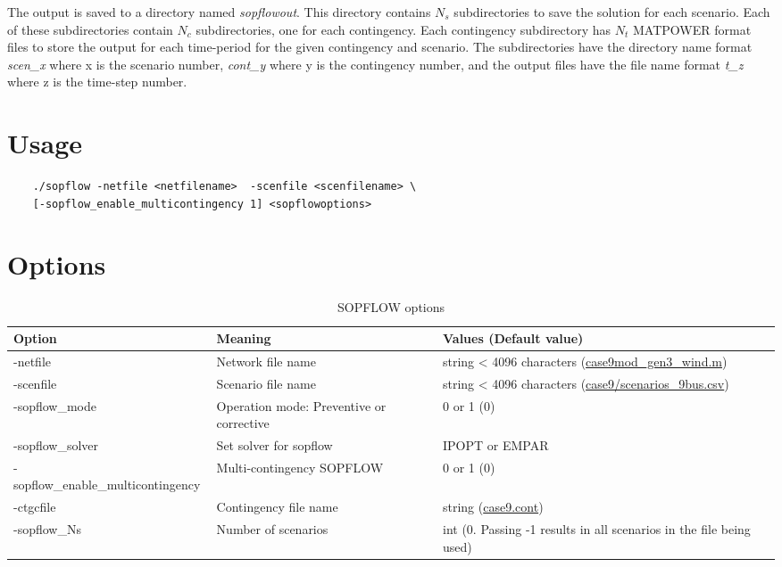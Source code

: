 The \sopflow output is saved to a directory named \emph{sopflowout}. This directory contains $N_s$ subdirectories to save the solution for each scenario. Each of these subdirectories contain $N_c$ subdirectories, one for each contingency. Each contingency subdirectory has $N_t$ MATPOWER format files to store the output for each time-period for the given contingency and scenario. The subdirectories have the directory name format \emph{scen\_x} where x is the scenario number,  \emph{cont\_y} where y is the contingency number, and the output files have the file name format \emph{t\_z} where z is the time-step number.

\section{Usage}
\begin{lstlisting}
    ./sopflow -netfile <netfilename>  -scenfile <scenfilename> \
    [-sopflow_enable_multicontingency 1] <sopflowoptions>
\end{lstlisting}

\section{Options}

\begin{table}[!htbp]
  \caption{SOPFLOW options}
  \small
  \begin{tabular}{|p{}|p{}|p{}|}
    \hline
    \textbf{Option} & \textbf{Meaning} & \textbf{Values (Default value)} \\ \hline
    -netfile & Network file name & string < 4096 characters (\href{https://gitlab.pnnl.gov/exasgd/frameworks/exago/-/blob/master/datafiles/case9/case9mod_gen3_wind.m}{case9mod\_gen3\_wind.m}) \\ \hline
    -scenfile & Scenario file name & string < 4096 characters (\href{https://gitlab.pnnl.gov/exasgd/frameworks/exago/-/blob/master/datafiles/case9/scenarios_9bus.csv}{case9/scenarios\_9bus.csv}) \\ \hline
    -sopflow\_mode & Operation mode: Preventive or corrective & 0 or 1 (0) \\ \hline
    -sopflow\_solver & Set solver for sopflow & IPOPT or  EMPAR \\ \hline
    -sopflow\_enable\_multicontingency & Multi-contingency SOPFLOW & 0 or 1 (0) \\ \hline \hline
    -ctgcfile & Contingency file name & string (\href{https://gitlab.pnnl.gov/exasgd/frameworks/exago/-/blob/master/datafiles/case9/case9.cont}{case9.cont}) \\ \hline
    -sopflow\_Ns & Number of scenarios & int (0. Passing -1 results in all scenarios in the file being used) \\ \hline
  \end{tabular}
  \label{tab:sopflow_options}
\end{table}

